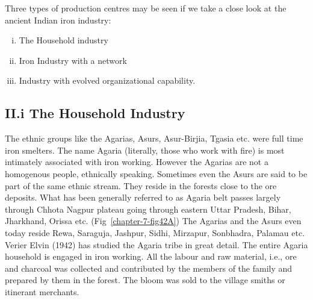 \vspace{-.15cm}

Three types of production centres may be seen if we take a close look at the ancient Indian iron industry:

\vspace{-.3cm}

\begin{enumerate}[i.]
\item The Household industry
\item Iron Industry with a network
\item Industry with evolved organizational capability.
\end{enumerate}

\vspace{-.3cm}

\subsection*{II.i The Household Industry}\label{subsection-1}

\vspace{-.2cm}

The ethnic groups like the Agarias, Asurs, Asur-Birjia, Tgasia etc. were full time iron smelters.  The name Agaria (literally, those who work with fire) is most intimately associated with iron working.  However the Agarias are not a homogenous people, ethnically speaking.  Sometimes even the Asurs are said to be part of the same ethnic stream.  They reside in the forests close to the ore deposits. What has been generally referred to as Agaria belt passes largely through Chhota Nagpur plateau going through eastern Uttar Pradesh, Bihar, Jharkhand, Orissa etc. (Fig~\ref{chapter-7-fig42A}) The Agarias and the Asurs even today reside Rewa, Saraguja, Jashpur, Sidhi, Mirzapur, Sonbhadra, Palamau etc. Verier Elvin (1942) has studied the Agaria tribe in great detail. The entire Agaria household is engaged in iron working. All the labour and raw material, i.e., ore and charcoal was collected and contributed by the members of the family and prepared by them in the forest. The bloom was sold to the village smiths or itinerant merchants. 


